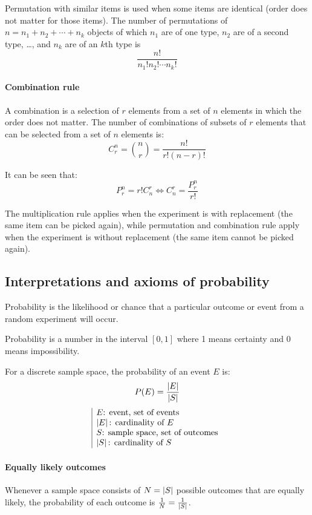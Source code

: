 \documentclass[10pt, twocolumn]{article}
\begin{document}
Permutation with similar items is used when some items are identical (order does not matter for those items).
The number of permutations of \(n = n_1 + n_2 + \cdots + n_k\) objects of which \(n_1\) are of one type, \(n_2\) are of a second type, \dots, and \(n_k\) are of an \(k\)th type is
\[
  \frac{n!}{n_1! n_2! \cdots n_k!}
\]


\paragraph{Combination rule}
A combination is a selection of \(r\) elements from a set of \(n\) elements in which the order does not matter.
The number of combinations of subsets of \(r\) elements that can be selected from a set of \(n\) elements is:
\[
  C_r^n = \binom{n}{r} = \frac{n!}{r!(n - r)!}
\]

\begin{remark}
  It can be seen that:
  \[
    P_r^n = r! C_n^r \iff C_n^r = \frac{P_r^n}{r!}
  \]
\end{remark}


\begin{remark}
  The multiplication rule applies when the experiment is with replacement (the same item can be picked again), while permutation and combination rule apply when the experiment is without replacement (the same item cannot be picked again).
\end{remark}

\subsection{Interpretations and axioms of probability}
Probability is the likelihood or chance that a particular outcome or event from a random experiment will occur.

Probability is a number in the interval \([0,1]\) where 1 means certainty and 0 means impossibility.

For a discrete sample space, the probability of an event \(E\) is:
\[
  P(E) = \frac{\left| E \right|}{\left| S \right|}
\]
\[
  \begin{array}{|l}
    E \text{: event, set of events}          \\
    \left| E \right| \text{: cardinality of } E       \\
    S \text{: sample space, set of outcomes} \\
    \left| S \right| \text{: cardinality of } S
  \end{array}
\]

\paragraph{Equally likely outcomes}
Whenever a sample space consists of \(N = \left| S \right|\) possible outcomes that are equally likely, the probability of each outcome is \(\frac{1}{N} = \frac{1}{\left| S \right|}\).
\end{document}
